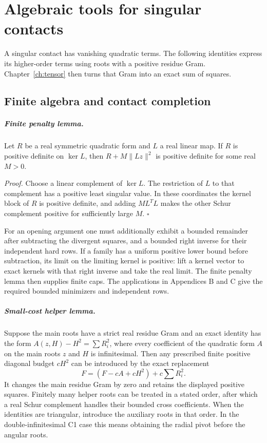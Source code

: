 \chapter{Algebraic tools for singular contacts}
\label{ch:mechanisms}
A singular contact has vanishing quadratic terms. The following identities
express its higher-order terms using roots with a positive residue Gram.
Chapter~\ref{ch:tensor} then turns that Gram into an exact sum of squares.
\section{Finite algebra and contact completion}
\paragraph{Finite penalty lemma.}
Let $R$ be a real symmetric quadratic form and $L$ a real linear
map.  If $R$ is positive definite on $\ker L$, then
$R+M\|Lz\|^2$ is positive definite for some real $M>0$.

\emph{Proof.}
Choose a linear complement of $\ker L$.  The restriction of $L$
to that complement has a positive least singular value.  In these
coordinates the kernel block of $R$ is positive definite, and
adding $M L^TL$ makes the other Schur complement positive for
sufficiently large $M$. \hfill$\square$

For an opening argument one must additionally exhibit a bounded
remainder after subtracting the divergent squares, and a bounded
right inverse for their independent hard rows.  If a family has a
uniform positive lower bound before subtraction, its limit on the
limiting kernel is positive: lift a kernel vector to exact kernels
with that right inverse and take the real limit.  The finite penalty
lemma then supplies finite caps.  The applications in Appendices B and C give the
required bounded minimizers and independent rows.

\paragraph{Small-cost helper lemma.}
Suppose the main roots have a strict real residue Gram and an exact
identity has the form $A(z,H)-H^2=\sum R_i^2$, where every
coefficient of the quadratic form $A$ on the main roots $z$ and
$H$ is infinitesimal.  Then any prescribed finite positive diagonal
budget $cH^2$ can be introduced by the exact replacement
\[
          F=(F-cA+cH^2)+c\sum R_i^2.
\]
It changes the main residue Gram by zero and retains the displayed
positive squares.  Finitely
many helper roots can be treated in a stated order, after which a
real Schur complement handles their bounded cross coefficients.
When the identities are triangular, introduce the auxiliary roots in
that order. In the double-infinitesimal C1 case this means obtaining
the radial pivot before the angular roots.



